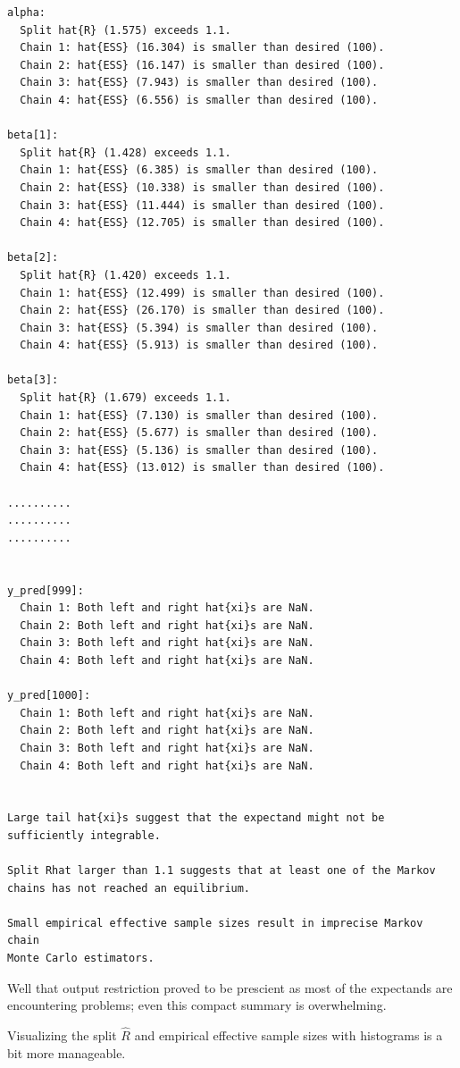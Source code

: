 \documentclass[
  letterpaper,
  DIV=11,
  numbers=noendperiod]{scrartcl}
\begin{document}
\begin{verbatim}
alpha:
  Split hat{R} (1.575) exceeds 1.1.
  Chain 1: hat{ESS} (16.304) is smaller than desired (100).
  Chain 2: hat{ESS} (16.147) is smaller than desired (100).
  Chain 3: hat{ESS} (7.943) is smaller than desired (100).
  Chain 4: hat{ESS} (6.556) is smaller than desired (100).

beta[1]:
  Split hat{R} (1.428) exceeds 1.1.
  Chain 1: hat{ESS} (6.385) is smaller than desired (100).
  Chain 2: hat{ESS} (10.338) is smaller than desired (100).
  Chain 3: hat{ESS} (11.444) is smaller than desired (100).
  Chain 4: hat{ESS} (12.705) is smaller than desired (100).

beta[2]:
  Split hat{R} (1.420) exceeds 1.1.
  Chain 1: hat{ESS} (12.499) is smaller than desired (100).
  Chain 2: hat{ESS} (26.170) is smaller than desired (100).
  Chain 3: hat{ESS} (5.394) is smaller than desired (100).
  Chain 4: hat{ESS} (5.913) is smaller than desired (100).

beta[3]:
  Split hat{R} (1.679) exceeds 1.1.
  Chain 1: hat{ESS} (7.130) is smaller than desired (100).
  Chain 2: hat{ESS} (5.677) is smaller than desired (100).
  Chain 3: hat{ESS} (5.136) is smaller than desired (100).
  Chain 4: hat{ESS} (13.012) is smaller than desired (100).

..........
..........
..........


y_pred[999]:
  Chain 1: Both left and right hat{xi}s are NaN.
  Chain 2: Both left and right hat{xi}s are NaN.
  Chain 3: Both left and right hat{xi}s are NaN.
  Chain 4: Both left and right hat{xi}s are NaN.

y_pred[1000]:
  Chain 1: Both left and right hat{xi}s are NaN.
  Chain 2: Both left and right hat{xi}s are NaN.
  Chain 3: Both left and right hat{xi}s are NaN.
  Chain 4: Both left and right hat{xi}s are NaN.


Large tail hat{xi}s suggest that the expectand might not be
sufficiently integrable.

Split Rhat larger than 1.1 suggests that at least one of the Markov
chains has not reached an equilibrium.

Small empirical effective sample sizes result in imprecise Markov chain
Monte Carlo estimators.
\end{verbatim}

Well that output restriction proved to be prescient as most of the
expectands are encountering problems; even this compact summary is
overwhelming.

Visualizing the split \(\hat{R}\) and empirical effective sample sizes
with histograms is a bit more manageable.
\end{document}

